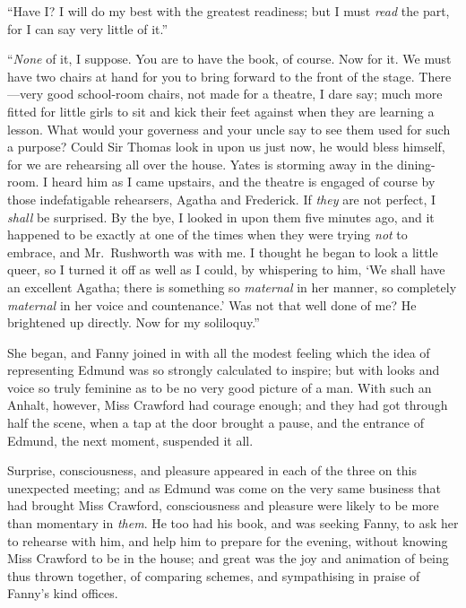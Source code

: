 \documentclass{article}
\begin{document}
``Have I?  I will do my best with the greatest readiness;
but I must \emph{read} the part, for I can say very little
of it.''

``\emph{None} of it, I suppose.  You are to have the book,
of course.  Now for it.  We must have two chairs at hand
for you to bring forward to the front of the stage.
There---very good school-room chairs, not made for a theatre,
I dare say; much more fitted for little girls to sit and
kick their feet against when they are learning a lesson.
What would your governess and your uncle say to see them
used for such a purpose?  Could Sir Thomas look in upon us
just now, he would bless himself, for we are rehearsing
all over the house.  Yates is storming away in the
dining-room. I heard him as I came upstairs, and the theatre
is engaged of course by those indefatigable rehearsers,
Agatha and Frederick.  If \emph{they} are not perfect,
I \emph{shall} be surprised.  By the bye, I looked in upon
them five minutes ago, and it happened to be exactly at
one of the times when they were trying \emph{not} to embrace,
and Mr.\ Rushworth was with me.  I thought he began to look
a little queer, so I turned it off as well as I could,
by whispering to him, `We shall have an excellent Agatha;
there is something so \emph{maternal} in her manner,
so completely \emph{maternal} in her voice and countenance.'
Was not that well done of me?  He brightened up directly.
Now for my soliloquy.''

She began, and Fanny joined in with all the modest feeling
which the idea of representing Edmund was so strongly
calculated to inspire; but with looks and voice so truly
feminine as to be no very good picture of a man.  With such
an Anhalt, however, Miss Crawford had courage enough;
and they had got through half the scene, when a tap at
the door brought a pause, and the entrance of Edmund,
the next moment, suspended it all.

Surprise, consciousness, and pleasure appeared in each
of the three on this unexpected meeting; and as Edmund
was come on the very same business that had brought
Miss Crawford, consciousness and pleasure were likely
to be more than momentary in \emph{them}.  He too had his book,
and was seeking Fanny, to ask her to rehearse with him,
and help him to prepare for the evening, without knowing
Miss Crawford to be in the house; and great was the joy and
animation of being thus thrown together, of comparing schemes,
and sympathising in praise of Fanny's kind offices.
\end{document}
